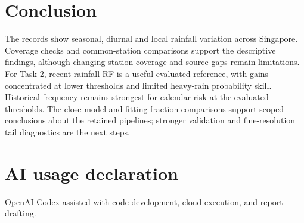 \section{Conclusion}
The records show seasonal, diurnal and local rainfall variation across Singapore. Coverage checks and common-station comparisons support the descriptive findings, although changing station coverage and source gaps remain limitations. For Task 2, recent-rainfall RF is a useful evaluated reference, with gains concentrated at lower thresholds and limited heavy-rain probability skill. Historical frequency remains strongest for calendar risk at the evaluated thresholds. The close model and fitting-fraction comparisons support scoped conclusions about the retained pipelines; stronger validation and fine-resolution tail diagnostics are the next steps.

\par\noindent\begin{minipage}{\linewidth}
\section*{AI usage declaration}
OpenAI Codex assisted with code development, cloud execution, and report drafting.
\end{minipage}
